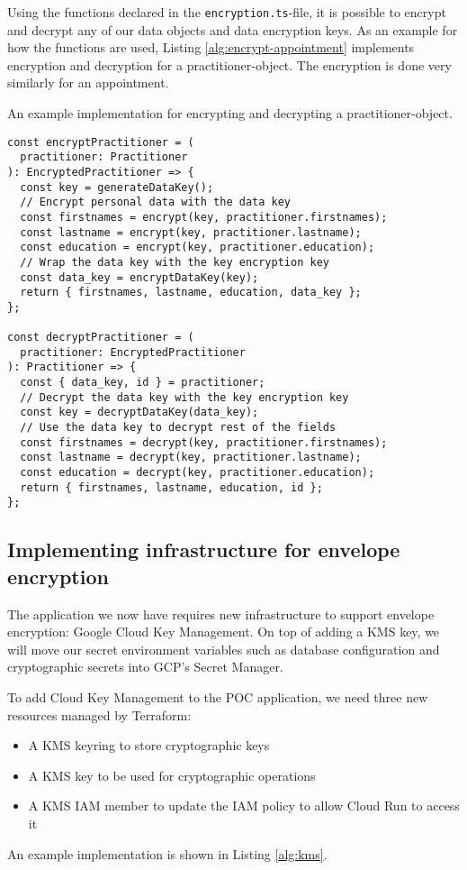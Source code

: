 Using the functions declared in the \texttt{encryption.ts}-file, it is possible to encrypt and decrypt any of our data objects and data encryption keys.
As an example for how the functions are used, Listing \ref{alg:encrypt-appointment} implements encryption and decryption for a practitioner-object.
The encryption is done very similarly for an appointment.

\begin{breakablealgorithm}
\caption{An example implementation for encrypting and decrypting a practitioner-object.}
\begin{verbatim}
const encryptPractitioner = (
  practitioner: Practitioner
): EncryptedPractitioner => {
  const key = generateDataKey();
  // Encrypt personal data with the data key
  const firstnames = encrypt(key, practitioner.firstnames);
  const lastname = encrypt(key, practitioner.lastname);
  const education = encrypt(key, practitioner.education);
  // Wrap the data key with the key encryption key
  const data_key = encryptDataKey(key);
  return { firstnames, lastname, education, data_key };
};

const decryptPractitioner = (
  practitioner: EncryptedPractitioner
): Practitioner => {
  const { data_key, id } = practitioner;
  // Decrypt the data key with the key encryption key
  const key = decryptDataKey(data_key);
  // Use the data key to decrypt rest of the fields
  const firstnames = decrypt(key, practitioner.firstnames);
  const lastname = decrypt(key, practitioner.lastname);
  const education = decrypt(key, practitioner.education);
  return { firstnames, lastname, education, id };
};
\end{verbatim}
\label{alg:encrypt-appointment}
\end{breakablealgorithm}


\subsection{Implementing infrastructure for envelope encryption}

The application we now have requires new infrastructure to support envelope encryption: Google Cloud Key Management.
On top of adding a KMS key, we will move our secret environment variables such as database configuration and cryptographic secrets into GCP's Secret Manager.

To add Cloud Key Management to the POC application, we need three new resources managed by Terraform:
\begin{itemize}
    \item A KMS keyring to store cryptographic keys
    \item A KMS key to be used for cryptographic operations
    \item A KMS IAM member to update the IAM policy to allow Cloud Run to access it
\end{itemize}
An example implementation is shown in Listing \ref{alg:kms}.

